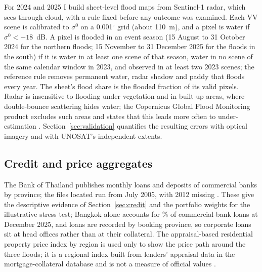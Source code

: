 For 2024 and 2025 I build sheet-level flood maps from Sentinel-1 radar, which sees through cloud, with a rule fixed before any outcome was examined. Each VV scene is calibrated to $\sigma^0$ on a 0.001$^\circ$ grid (about 110~m), and a pixel is water if $\sigma^0 < -18$~dB. A pixel is flooded in an event season (15 August to 31 October 2024 for the northern floods; 15 November to 31 December 2025 for the floods in the south) if it is water in at least one scene of that season, water in no scene of the same calendar window in 2023, and observed in at least two 2023 scenes; the reference rule removes permanent water, radar shadow and paddy that floods every year. The sheet's flood share is the flooded fraction of its valid pixels. Radar is insensitive to flooding under vegetation and in built-up areas, where double-bounce scattering hides water; the Copernicus Global Flood Monitoring product excludes such areas and states that this leads more often to under-estimation \citep{gfm2025product}. Section~\ref{sec:validation} quantifies the resulting errors with optical imagery and with UNOSAT's independent extents.

\subsection{Credit and price aggregates}

The Bank of Thailand publishes monthly loans and deposits of commercial banks by province; the files located run from July 2005, with 2012 missing \citep{bot2026loansprovince}. These give the descriptive evidence of Section~\ref{sec:credit} and the portfolio weights for the illustrative stress test; Bangkok alone accounts for \bkkShare\% of commercial-bank loans at December 2025, and loans are recorded by booking province, so corporate loans sit at head offices rather than at their collateral. The appraisal-based residential property price index by region is used only to show the price path around the three floods; it is a regional index built from lenders' appraisal data in the mortgage-collateral database and is not a measure of official values \citep{bot2025rppi,bot2026rppislides}.
